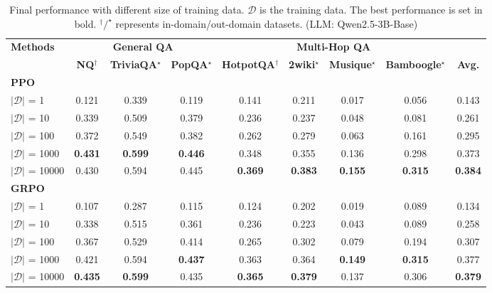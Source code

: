 \begin{table}[h]
    \centering
    \scriptsize
    \setlength{\tabcolsep}{4pt}
    
    \caption{Final performance with different size of training data. $\mathcal{D}$ is the training data. The best performance is set in bold. $^\dagger/^\star$ represents in-domain/out-domain datasets. (LLM: Qwen2.5-3B-Base)}\label{apx:tab:data-scaling}
    \begin{tabular}{lcccccccc}
        \toprule
        \textbf{Methods} & \multicolumn{3}{c}{\textbf{General QA}} & \multicolumn{4}{c}{\textbf{Multi-Hop QA}} \\
        
        \cmidrule(lr){2-4} \cmidrule(lr){5-8}
         & \textbf{NQ$^\dagger$} & \textbf{TriviaQA$^\star$} & \textbf{PopQA$^\star$} & \textbf{HotpotQA$^\dagger$} & \textbf{2wiki$^\star$} & \textbf{Musique$^\star$} & \textbf{Bamboogle$^\star$} & \textbf{Avg.} \\
        \midrule
        \multicolumn{9}{l}{\textbf{PPO}} \\
        \hdashline
        $|\mathcal{D}|$ = 1 & 0.121 & 0.339 & 0.119 & 	0.141 & 0.211 & 0.017 & 0.056 & 0.143  \\
        $|\mathcal{D}|$ = 10 & 0.339 & 0.509 & 0.379 & 0.236 & 0.237 & 0.048 & 0.081	& 0.261  \\
        $|\mathcal{D}|$ = 100 & 0.372 & 0.549 & 0.382 & 0.262 & 0.279 & 0.063 & 0.161 & 0.295  \\
        $|\mathcal{D}|$ = 1000 & \textbf{0.431} & \textbf{0.599} & \textbf{0.446} & 0.348 & 0.355 & 0.136 & 0.298 & 0.373  \\
        $|\mathcal{D}|$ = 10000 &  0.430 & 0.594 & 0.445 & \textbf{0.369} & \textbf{0.383} & \textbf{0.155} & \textbf{0.315} & \textbf{0.384} \\
        \midrule
        \multicolumn{9}{l}{\textbf{GRPO}} \\
        \hdashline
        $|\mathcal{D}|$ = 1 & 0.107 & 0.287 & 0.115 & 0.124 & 0.202 & 0.019 & 0.089 & 0.134  \\
        $|\mathcal{D}|$ = 10 & 0.338 & 0.515 & 0.361 & 0.236 & 0.223 & 0.043 & 0.089 & 0.258  \\
        $|\mathcal{D}|$ = 100 & 0.367 & 0.529 & 0.414 & 0.265 & 0.302 & 0.079 & 0.194 & 0.307  \\
        $|\mathcal{D}|$ = 1000 & 0.421 & 0.594 & \textbf{0.437} & 0.363 & 0.364 & \textbf{0.149} & \textbf{0.315} & 0.377  \\
        $|\mathcal{D}|$ = 10000 &  \textbf{0.435} & \textbf{0.599} & 0.435 & \textbf{0.365} & \textbf{0.379} & 0.137 & 0.306 & \textbf{0.379} \\
        \bottomrule
    \end{tabular}
\end{table}

